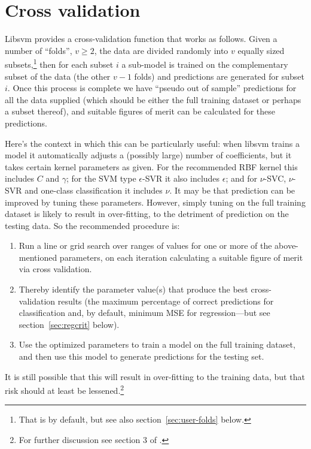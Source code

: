 \documentclass{article}
\begin{document}
\section{Cross validation}
\label{sec:xvalid}

\textsf{Libsvm} provides a cross-validation function that works as
follows. Given a number of ``folds'', $v \geq 2$, the data are divided
randomly into $v$ equally sized subsets,\footnote{That is by default,
  but see also section~\ref{sec:user-folds} below.} then for each subset
$i$ a sub-model is trained on the complementary subset of the data (the
other $v-1$ folds) and predictions are generated for subset $i$. Once
this process is complete we have ``pseudo out of sample'' predictions
for all the data supplied (which should be either the full training
dataset or perhaps a subset thereof), and suitable figures of merit can
be calculated for these predictions.

Here's the context in which this can be particularly useful: when
\textsf{libsvm} trains a model it automatically adjusts a (possibly
large) number of coefficients, but it takes certain kernel parameters
as given. For the recommended RBF kernel this includes $C$ and
$\gamma$; for the SVM type $\epsilon$-SVR it also includes $\epsilon$;
and for $\nu$-SVC, $\nu$-SVR and one-class classification it includes
$\nu$. It may be that prediction can be improved by tuning these
parameters. However, simply tuning on the full training dataset is
likely to result in over-fitting, to the detriment of prediction on
the testing data. So the recommended procedure is:
\begin{enumerate}
\item Run a line or grid search over ranges of values for one or more
  of the above-mentioned parameters, on each iteration calculating a
  suitable figure of merit via cross validation.
\item Thereby identify the parameter value(s) that produce the best
  cross-validation results (the maximum percentage of correct
  predictions for classification and, by default, minimum MSE for
  regression---but see section~\ref{sec:regcrit} below).
\item Use the optimized parameters to train a model on the full
  training dataset, and then use this model to generate predictions
  for the testing set.
\end{enumerate}

It is still possible that this will result in over-fitting to the
training data, but that risk should at least be lessened.\footnote{For
  further discussion see section 3 of \cite{HCL16}.}
\end{document}
